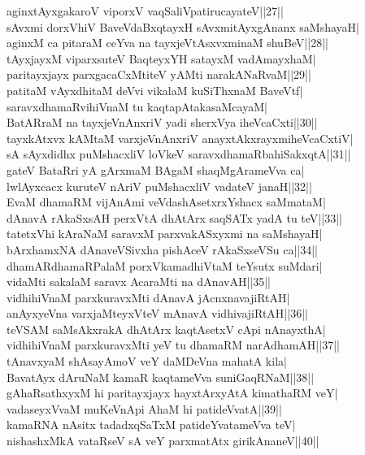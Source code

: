 \documentclass{article}
\begin{document}
aginxtAyxgakaroV viporxV vaqSaliVpatirucayateV||27||\\
sAvxmi dorxVhiV BaveVdaBxqtayxH sAvxmitAyxgAnanx saMshayaH|\\
aginxM ca pitaraM ceYva na tayxjeVtAsxvxminaM shuBeV||28||\\
tAyxjayxM viparxsuteV BaqteyxYH satayxM vadAmayxhaM|\\
paritayxjayx parxgacaCxMtiteV yAMti narakANaRvaM||29||\\
patitaM vAyxdhitaM deVvi vikalaM kuSiThxnaM BaveVtf|\\
saravxdhamaRvihiVnaM tu kaqtapAtakasaMcayaM|\\
BatARraM na tayxjeVnAnxriV yadi sherxVya iheVcaCxti||30||\\
tayxkAtxvx kAMtaM varxjeVnAnxriV anayxtAkxrayxmiheVcaCxtiV|\\
sA sAyxdidhx puMshacxliV loVkeV saravxdhamaRbahiSakxqtA||31||\\
gateV BataRri yA gArxmaM BAgaM shaqMgArameVva ca|\\
lwlAyxcacx kuruteV nAriV puMshacxliV vadateV janaH||32||\\
EvaM dhamaRM vijAnAmi veVdashAsetxrxYshacx saMmataM|\\
dAnavA rAkaSxsAH perxVtA dhAtArx saqSATx yadA tu teV||33||\\
tatetxVhi kAraNaM saravxM parxvakASxyxmi na saMshayaH|\\
bArxhamxNA dAnaveVSivxha pishAceV rAkaSxseVSu ca||34||\\
dhamARdhamaRPalaM porxVkamadhiVtaM teYsutx suMdari|\\
vidaMti sakalaM saravx AcaraMti na dAnavAH||35||\\
vidhihiVnaM parxkuravxMti dAnavA jAcnxnavajiRtAH|\\
anAyxyeVna varxjaMteyxVteV mAnavA vidhivajiRtAH||36||\\
teVSAM saMsAkxrakA dhAtArx kaqtAsetxV cApi nAnayxthA|\\
vidhihiVnaM parxkuravxMti yeV tu dhamaRM narAdhamAH||37||\\
tAnavxyaM shAsayAmoV veY daMDeVna mahatA kila|\\
BavatAyx dAruNaM kamaR kaqtameVva suniGaqRNaM||38||\\
gAhaRsathxyxM hi paritayxjayx hayxtArxyAtA kimathaRM veY|\\
vadaseyxVvaM muKeVnApi AhaM hi patideVvatA||39||\\
kamaRNA nAsitx tadadxqSaTxM patideYvatameVva teV|\\
nishashxMkA vataRseV sA veY parxmatAtx girikAnaneV||40||\\
\end{document}
